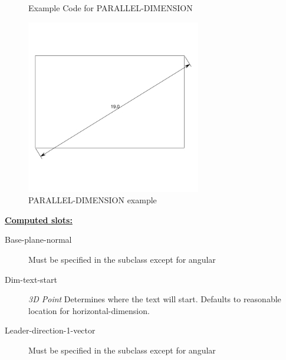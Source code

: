 \documentclass [11pt]{book}
\begin{document}
\begin{itemize}
\begin{figure}
\begin{lrbox}{\boxedverb}
\begin{minipage}{\linewidth}
{\begin{verbatim}
\end{verbatim}}
\end{minipage}
\end{lrbox}
\fbox{\usebox{\boxedverb}}

\caption{Example Code for PARALLEL-DIMENSION}

\label{fig:example-code-PARALLEL-DIMENSION}

\end{figure}

\begin{figure}
\begin{center}
\includegraphics[width=3in,height=3in]{../images/example-PARALLEL-DIMENSION.pdf}
\end{center}

\caption{PARALLEL-DIMENSION example}

\label{fig:PARALLEL-DIMENSION}

\end{figure}





\textbf{
\underline{Computed slots:}}

\begin{description}

\item [Base-plane-normal]
Must be specified in the subclass except for angular


\item [Dim-text-start]
\emph{3D Point} Determines where the text will start. Defaults to reasonable location for
horizontal-dimension.


\item [Leader-direction-1-vector]
Must be specified in the subclass except for angular



\end{description}
\end{itemize}
\end{document}
